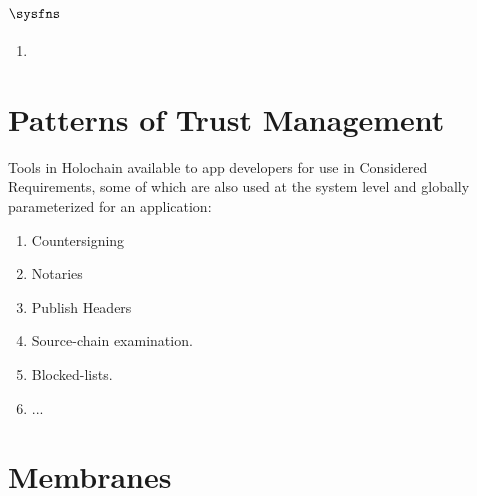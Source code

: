 \documentclass[twocolumn,showpacs,%
  nofootinbib,aps,superscriptaddress,%
  eqsecnum,prd,notitlepage,showkeys,10pt]{revtex4-1}
\begin{document}
\section{$\sysfns$}
\label{apdx:sysfn}
\begin{enumerate}
\item {}
\end{enumerate}

\section{Patterns of Trust Management}
\label{apdx:trust}

Tools in Holochain available to app developers for use in Considered Requirements, some of which are also used at the system level and globally parameterized for an application:
\begin{enumerate}
\item Countersigning 
\item Notaries 
\item Publish Headers  
\item Source-chain examination.  
\item Blocked-lists. 
\item ... 
\end {enumerate}

\section{Membranes}
\label{apdx:membranes}
\end{document}
